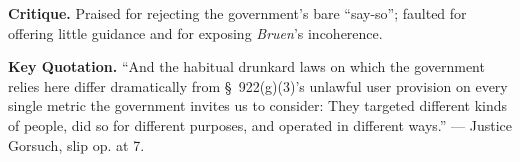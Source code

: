 \documentclass[12pt]{article}
\begin{document}
\textbf{Critique.} Praised for rejecting the government's bare ``say-so''; faulted for offering little guidance and for exposing \textit{Bruen}'s incoherence.

\textbf{Key Quotation.} ``And the habitual drunkard laws on which the government relies here differ dramatically from \S~922(g)(3)'s unlawful user provision on every single metric the government invites us to consider: They targeted different kinds of people, did so for different purposes, and operated in different ways.'' --- Justice Gorsuch, slip op. at 7.
\end{document}

